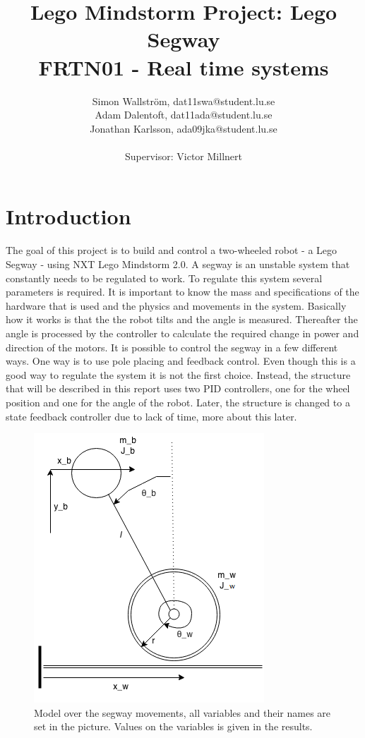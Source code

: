 \documentclass[a4paper]{article}
\title{Lego Mindstorm Project: Lego Segway\\
FRTN01 - Real time systems}
\author{Simon Wallström, dat11swa@student.lu.se\\
Adam Dalentoft, dat11ada@student.lu.se\\
Jonathan Karlsson, ada09jka@student.lu.se\\\\
Supervisor: Victor Millnert}
\begin{document}

\maketitle
\thispagestyle{empty}
\newpage
\setcounter{page}{1}
\tableofcontents
\newpage
\section{Introduction}
The goal of this project is to build and control a two-wheeled robot - a Lego Segway - using NXT Lego Mindstorm 2.0. A segway is an unstable system that constantly needs to be regulated to work. To regulate this system several parameters is required. It is important to know the mass and specifications of the hardware that is used and the physics and movements in the system. Basically how it works is that the the robot tilts and the angle is measured. Thereafter the angle is processed by the controller to calculate the required change in power and direction of the motors. It is possible to control the segway in a few different ways. One way is to use pole placing and feedback control. Even though this is a good way to regulate the system it is not the first choice. Instead, the structure that will be described in this report uses two PID controllers, one for the wheel position and one for the angle of the robot. Later, the structure is changed to a state feedback controller due to lack of time, more about this later.

\begin{figure}[H]
 \centering
\includegraphics[scale=0.8]{pic/segway.png}
\caption{Model over the segway movements, all variables and their names are set in the picture. Values on the variables is given in the results.}
\end{figure}
\end{document}
